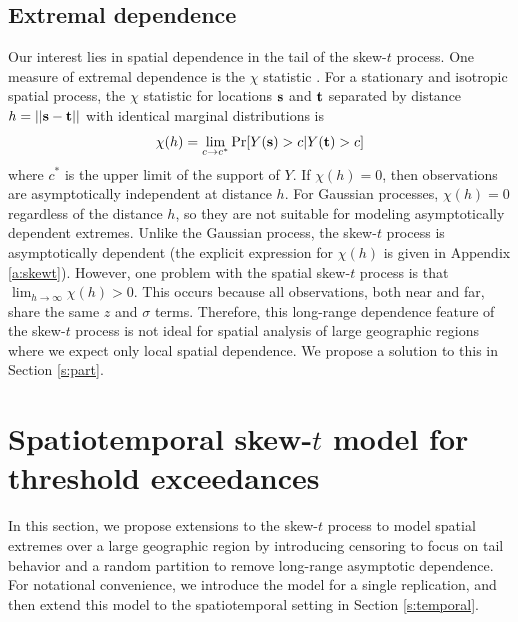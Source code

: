 \documentclass[11pt]{article}
\begin{document}
\subsection{Extremal dependence}\label{s:extdep}
Our interest lies in spatial dependence in the tail of the skew-$t$ process.
One measure of extremal dependence is the $\chi$ statistic \citep{Coles1999}.
For a stationary and isotropic spatial process, the $\chi$ statistic for locations $\mbox{\bf s}$ and $\mbox{\bf t}$ separated by distance $h = || \mbox{\bf s} - \mbox{\bf t} ||$ with identical marginal distributions is
\begin{align}
  \chi(h) = \lim_{c \rightarrow c^*} \Pr[Y(\mbox{\bf s}) > c | Y(\mbox{\bf t}) > c]
\end{align}
where $c^*$ is the upper limit of the support of $Y$.
If $\chi(h) = 0$, then observations are asymptotically independent at distance $h$.
For Gaussian processes, $\chi(h) = 0$ regardless of the distance $h$, so they are not suitable for modeling asymptotically dependent extremes.
Unlike the Gaussian process, the skew-$t$ process is asymptotically dependent (the explicit expression for $\chi(h)$ is given in Appendix \ref{a:skewt}).
However, one problem with the spatial skew-$t$ process is that $\lim_{h \rightarrow \infty} \chi(h) > 0$.
This occurs because all observations, both near and far, share the same $z$ and $\sigma$ terms.
Therefore, this long-range dependence feature of the skew-$t$ process is not ideal for spatial analysis of large geographic regions where we expect only local spatial dependence.
We propose a solution to this in Section \ref{s:part}.

\section{Spatiotemporal skew-$t$ model for threshold exceedances}\label{s:spatial}
In this section, we propose extensions to the skew-$t$ process to model spatial extremes over a large geographic region by introducing censoring to focus on tail behavior and a random partition to remove long-range asymptotic dependence.
For notational convenience, we introduce the model for a single replication, and then extend this model to the spatiotemporal setting in Section \ref{s:temporal}.
\end{document}
